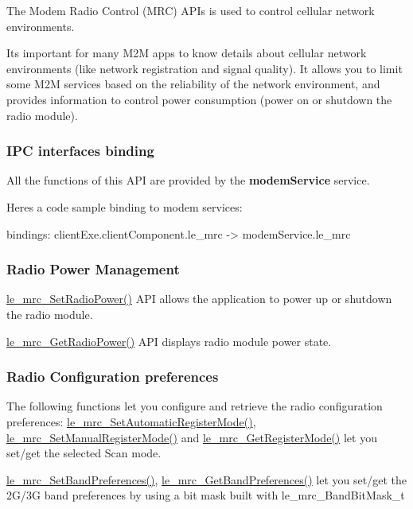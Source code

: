The Modem Radio Control (M\+R\+C) A\+P\+Is is used to control cellular network environments.

It\textquotesingle{}s important for many M2\+M apps to know details about cellular network environments (like network registration and signal quality). It allows you to limit some M2\+M services based on the reliability of the network environment, and provides information to control power consumption (power on or shutdown the radio module).\hypertarget{c_mrc_le_mrc_binding}{}\subsubsection{I\+P\+C interfaces binding}\label{c_mrc_le_mrc_binding}
All the functions of this A\+P\+I are provided by the {\bfseries modem\+Service} service.

Here\textquotesingle{}s a code sample binding to modem services\+: \begin{DoxyVerb}bindings:
{
   clientExe.clientComponent.le_mrc -> modemService.le_mrc
}
\end{DoxyVerb}
\hypertarget{c_mrc_le_mrc_power}{}\subsubsection{Radio Power Management}\label{c_mrc_le_mrc_power}
\hyperlink{le__mrc__interface_8h_a78bd27d92337e2122320f41bcaa5480f}{le\+\_\+mrc\+\_\+\+Set\+Radio\+Power()} A\+P\+I allows the application to power up or shutdown the radio module.

\hyperlink{le__mrc__interface_8h_aac51332c6c84e460746eb1ad45c064d6}{le\+\_\+mrc\+\_\+\+Get\+Radio\+Power()} A\+P\+I displays radio module power state.\hypertarget{c_mrc_le_mrc_configuration}{}\subsubsection{Radio Configuration preferences}\label{c_mrc_le_mrc_configuration}
The following functions let you configure and retrieve the radio configuration preferences\+: \hyperlink{le__mrc__interface_8h_acb434a9f91afb5b6639baf3678ee9388}{le\+\_\+mrc\+\_\+\+Set\+Automatic\+Register\+Mode()}, \hyperlink{le__mrc__interface_8h_a09b890f05a20f4b007d60e595026631f}{le\+\_\+mrc\+\_\+\+Set\+Manual\+Register\+Mode()} and \hyperlink{le__mrc__interface_8h_a283c0c092c5a135a8e95f9f091655cb1}{le\+\_\+mrc\+\_\+\+Get\+Register\+Mode()} let you set/get the selected Scan mode.

\hyperlink{le__mrc__interface_8h_ac808b4dc721e031566da92e00663c027}{le\+\_\+mrc\+\_\+\+Set\+Band\+Preferences()}, \hyperlink{le__mrc__interface_8h_a04418f56480070ba6c4f3d176dafaa37}{le\+\_\+mrc\+\_\+\+Get\+Band\+Preferences()} let you set/get the 2\+G/3\+G band preferences by using a bit mask built with {\ttfamily le\+\_\+mrc\+\_\+\+Band\+Bit\+Mask\+\_\+t} 

